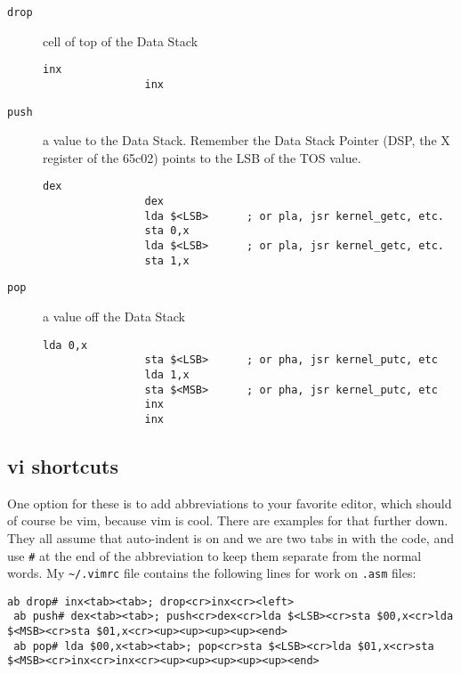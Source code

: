 \begin{description}

        \item [\texttt{drop}] cell of top of the Data Stack 

                \begin{lstlisting}[frame=single]
                inx
                inx
                \end{lstlisting}

        \item [\texttt{push}] a value to the Data Stack.  Remember the Data Stack
                Pointer (DSP, the X register of the 65c02) points to the LSB of
                the TOS value.

                \begin{lstlisting}[frame=single]
                dex
                dex
                lda $<LSB>      ; or pla, jsr kernel_getc, etc.
                sta 0,x
                lda $<LSB>      ; or pla, jsr kernel_getc, etc.
                sta 1,x
                \end{lstlisting}

        \item [\texttt{pop}] a value off the Data Stack

                \begin{lstlisting}[frame=single]
                lda 0,x
                sta $<LSB>      ; or pha, jsr kernel_putc, etc
                lda 1,x
                sta $<MSB>      ; or pha, jsr kernel_putc, etc
                inx
                inx
                \end{lstlisting}

\end{description}

\subsection{vi shortcuts}

One option for these is to add abbreviations to your favorite editor, which
should of course be vim, because vim is cool. There are examples for that
further down. They all assume that auto-indent is on and we are two tabs in with
the code, and use \texttt{\#} at the end of the abbreviation to keep them
separate from the normal words. My \texttt{\textasciitilde/.vimrc} file contains the following
lines for work on \texttt{.asm} files:
 

\begin{lstlisting}[frame=single]
 ab drop# inx<tab><tab>; drop<cr>inx<cr><left>
 ab push# dex<tab><tab>; push<cr>dex<cr>lda $<LSB><cr>sta $00,x<cr>lda $<MSB><cr>sta $01,x<cr><up><up><up><up><end>
 ab pop# lda $00,x<tab><tab>; pop<cr>sta $<LSB><cr>lda $01,x<cr>sta $<MSB><cr>inx<cr>inx<cr><up><up><up><up><up><end>
\end{lstlisting}
 
